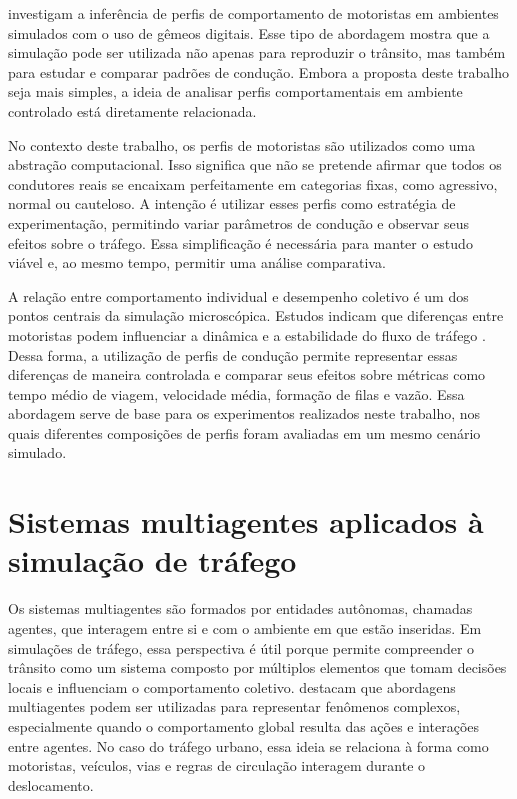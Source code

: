 investigam a inferência de perfis de comportamento de motoristas em ambientes simulados com o uso de gêmeos digitais. Esse tipo de abordagem mostra que a simulação pode ser utilizada não apenas para reproduzir o trânsito, mas também para estudar e comparar padrões de condução. Embora a proposta deste trabalho seja mais simples, a ideia de analisar perfis comportamentais em ambiente controlado está diretamente relacionada.

No contexto deste trabalho, os perfis de motoristas são utilizados como uma abstração computacional. Isso significa que não se pretende afirmar que todos os condutores reais se encaixam perfeitamente em categorias fixas, como agressivo, normal ou cauteloso. A intenção é utilizar esses perfis como estratégia de experimentação, permitindo variar parâmetros de condução e observar seus efeitos sobre o tráfego. Essa simplificação é necessária para manter o estudo viável e, ao mesmo tempo, permitir uma análise comparativa.

A relação entre comportamento individual e desempenho coletivo é um dos pontos centrais da simulação microscópica. Estudos indicam que diferenças entre motoristas podem influenciar a dinâmica e a estabilidade do fluxo de tráfego \cite{zhai_2021,makridis_2023}. Dessa forma, a utilização de perfis de condução permite representar essas diferenças de maneira controlada e comparar seus efeitos sobre métricas como tempo médio de viagem, velocidade média, formação de filas e vazão. Essa abordagem serve de base para os experimentos realizados neste trabalho, nos quais diferentes composições de perfis foram avaliadas em um mesmo cenário simulado.

\section{Sistemas multiagentes aplicados à simulação de tráfego}

Os sistemas multiagentes são formados por entidades autônomas, chamadas agentes, que interagem entre si e com o ambiente em que estão inseridas. Em simulações de tráfego, essa perspectiva é útil porque permite compreender o trânsito como um sistema composto por múltiplos elementos que tomam decisões locais e influenciam o comportamento coletivo.  destacam que abordagens multiagentes podem ser utilizadas para representar fenômenos complexos, especialmente quando o comportamento global resulta das ações e interações entre agentes. No caso do tráfego urbano, essa ideia se relaciona à forma como motoristas, veículos, vias e regras de circulação interagem durante o deslocamento.


